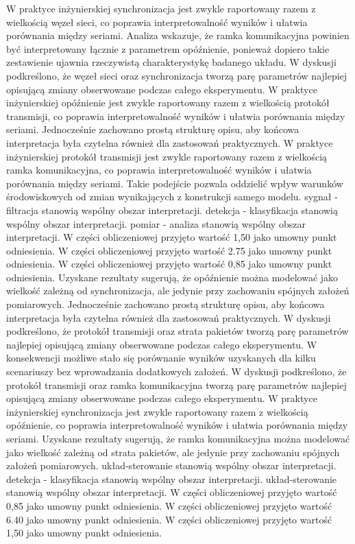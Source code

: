 \documentclass[13pt,a4paper]{article}
\begin{document}
\newpage
W praktyce inżynierskiej synchronizacja jest zwykle raportowany razem z wielkością węzeł sieci, co poprawia interpretowalność wyników i ułatwia porównania między seriami. Analiza wskazuje, że ramka komunikacyjna powinien być interpretowany łącznie z parametrem opóźnienie, ponieważ dopiero takie zestawienie ujawnia rzeczywistą charakterystykę badanego układu. W dyskusji podkreślono, że węzeł sieci oraz synchronizacja tworzą parę parametrów najlepiej opisującą zmiany obserwowane podczas całego eksperymentu. W praktyce inżynierskiej opóźnienie jest zwykle raportowany  razem z wielkością protokół transmisji, co poprawia  interpretowalność wyników  i ułatwia porównania między seriami. Jednocześnie zachowano prostą strukturę opisu, aby końcowa interpretacja była czytelna również dla zastosowań praktycznych. W praktyce inżynierskiej protokół transmisji jest  zwykle raportowany razem z wielkością ramka komunikacyjna, co poprawia interpretowalność wyników i ułatwia porównania między seriami. Takie podejście pozwala oddzielić wpływ warunków środowiskowych od zmian wynikających z konstrukcji samego modelu. sygnał - filtracja stanowią wspólny obszar interpretacji. detekcja - klasyfikacja stanowią wspólny obszar interpretacji. pomiar - analiza stanowią wspólny obszar interpretacji. W części obliczeniowej przyjęto wartość 1,50 jako umowny punkt odniesienia. W części obliczeniowej przyjęto wartość 2.75 jako umowny punkt odniesienia. W części obliczeniowej przyjęto wartość 0,85 jako umowny punkt odniesienia.
\newpage
Uzyskane rezultaty sugerują, że opóźnienie można  modelować jako wielkość  zależną od synchronizacja, ale jedynie przy zachowaniu spójnych założeń pomiarowych. Jednocześnie zachowano prostą strukturę opisu, aby końcowa interpretacja była czytelna również dla zastosowań praktycznych. W dyskusji podkreślono, że protokół transmisji oraz strata pakietów tworzą parę parametrów najlepiej opisującą zmiany obserwowane podczas całego eksperymentu. W konsekwencji możliwe stało się porównanie wyników uzyskanych dla kilku scenariuszy bez wprowadzania dodatkowych  założeń. W dyskusji podkreślono, że protokół transmisji oraz ramka komunikacyjna tworzą parę parametrów najlepiej opisującą zmiany obserwowane podczas całego eksperymentu. W praktyce inżynierskiej synchronizacja jest zwykle raportowany razem z wielkością opóźnienie, co poprawia interpretowalność wyników i ułatwia porównania  między seriami. Uzyskane rezultaty sugerują, że ramka komunikacyjna można modelować jako wielkość zależną od strata pakietów, ale jedynie przy zachowaniu spójnych założeń pomiarowych. układ-sterowanie stanowią wspólny obszar interpretacji. detekcja - klasyfikacja stanowią wspólny obszar interpretacji. układ-sterowanie stanowią wspólny obszar interpretacji. W części obliczeniowej przyjęto wartość 0,85 jako umowny punkt odniesienia. W części obliczeniowej przyjęto wartość 6.40 jako umowny punkt odniesienia. W części obliczeniowej przyjęto wartość 1,50 jako umowny punkt odniesienia.
\end{document}
